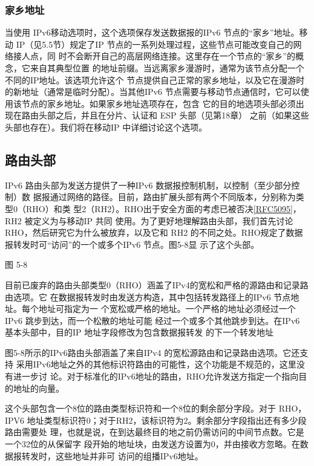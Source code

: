 \subsubsection{家乡地址}
当使用 IPv6移动选项时，这个选项保存发送数据报的IPv6 节点的“家乡”地址。移动
IP（见5.5节）规定了IP 节点的一系列处理过程，这些节点可能改变自己的网络接人点，同
时不会断开自己的高层网络连接。这里存在一个节点的“家乡”的概念，它来自其典型位置
的地址前缀。当远离家乡漫游时，通常为该节点分配一个不同的IP地址。该选项允许这个
节点提供自己正常的家乡地址，以及它在漫游时的新地址（通常是临时分配）。当其他IPv6
节点需要与移动节点通信时，它可以使用该节点的家乡地址。如果家乡地址选项存在，包含
它的目的地选项头部必须出现在路由头部之后，并且在分片、认证和 ESP 头部（见第18章）
之前（如果这些头部也存在）。我们将在移动IP 中详细讨论这个选项。

\subsection{路由头部}
IPv6 路由头部为发送方提供了一种IPv6 数据报控制机制，以控制（至少部分控制）数
据报通过网络的路径。目前，路由扩展头部有两个不同版本，分别称为类型0（RHO）和类
型2（RH2）。RHO出于安全方面的考虑已被否决\href{https://www.rfc-editor.org/rfc/rfc5095}{[RFC5095]}，RH2
被定义为与移动IP 共同
使用。为了更好地理解路由头部，我们首先讨论 RHO，然后研究它为什么被放弃，以及它和
RH2 的不同之处。RHO规定了数据报转发时可“访问”的一个或多个IPv6 节点。图5-8显
示了这个头部。

图 5-8

目前已废弃的路由头部类型0（RHO）涵盖了IPv4的宽松和严格的源路由和记录路由选项。它
在数据报转发时由发送方构造，其中包括转发路径上的IPv6 节点地址。每个地址可指定为一
个宽松或严格的地址。一个严格的地址必须经过一个 IPv6 跳步到达，而一个松散的地址可能
经过一个或多个其他跳步到达。在IPv6 基本头部中，目的IP 地址字段修改为包含数据报转发
的下一个转发地址

图5-8所示的IPv6路由头部涵盖了来自IPv4 的宽松源路由和记录路由选项。它还支持
采用IPv6地址之外的其他标识符路由的可能性，这个功能是不规范的，这里没有进一步讨
论。对于标准化的IPv6地址的路由，RHO允许发送方指定一个指向目的地址的向量。

这个头部包含一个8位的路由类型标识符和一个8位的剩余部分字段。对于 RHO，IPV6
地址类型标识符0；对于RH2，该标识符为2。剩余部分字段指出还有多少段路由需要处
理，也就是说，在到达最终目的地之前仍需访问的中间节点数。它是一个32位的从保留字
段开始的地址块，由发送方设置为0，并由接收方忽略。在数据报转发时，这些地址并非可
访问的组播IPv6地址。

